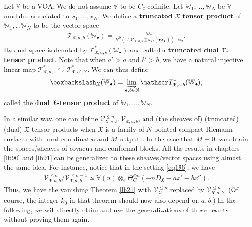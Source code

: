 \documentclass[12pt,b5paper,notitlepage]{report}
\theoremstyle{definition}
\theoremstyle{plain}
\newcommand{\fk}{\mathfrak}
\newcommand{\scr}{\mathscr}
\newcommand{\SX}{S_{\fk X}}
\newcommand{\DX}{D_{\fk X}}
\newcommand{\blt}{\bullet}
\newcommand{\Vbb}{\mathbb V}
\newcommand{\Wbb}{\mathbb W}
\newcommand{\Cbb}{\mathbb C}
\newcommand{\Nbb}{\mathbb N}
\newcommand{\low}{\mathrm{low}}
\numberwithin{equation}{section}
\begin{document}
Let $\Vbb$ be a  VOA. We do not assume $\Vbb$ to be $C_2$-cofinite. Let $\Wbb_1,\dots,\Wbb_N$ be $\Vbb$-modules associated to $x_1,\dots,x_N$. We define a \textbf{truncated  $\fk X$-tensor product} of $\Wbb_1,\dots\Wbb_N$  to be the vector space \index{T@$\scr T_{\fk X,a,b}(\Wbb_\blt),\scr T_{\fk X,a,b}^*(\Wbb_\blt)$}
\begin{align}
\scr T_{\fk X,a,b}(\Wbb_\blt)=\frac{\Wbb_\blt}{H^0(C,\scr V_{\fk X,a,b}\otimes\omega_C(\blt\SX))\cdot\Wbb_\blt}.
\end{align}
Its dual space is denoted by $\scr T_{\fk X,a,b}^*(\Wbb_\blt)$ and called a \textbf{truncated dual $\fk X$-tensor product}. Note that when $a'>a$ and $b'>b$, we have a natural injective linear map $\scr T_{\fk X,a,b}^*\hookrightarrow \scr T_{\fk X,a',b'}^*$. We can thus define \index{W@$\boxbackslash_{\fk X}(\Wbb_\blt),\boxbackslash_{\fk X}^\low(\Wbb_\blt)$}
\begin{gather*}
\boxbackslash_{\fk X}(\Wbb_\blt)=\varinjlim_{a,b\in\Nbb}\scr T_{\fk X,a,b}^*(\Wbb_\blt),
\end{gather*}
called the \textbf{dual $\fk X$-tensor product} of $\Wbb_1,\dots,\Wbb_N$.


In a similar way, one can define $\scr V_{\fk X,a,b}^{\leq n},\scr V_{\fk X,a,b}$, and (the sheaves of) (truncated) (dual) $\fk X$-tensor products  when $\fk X$ is a family of $N$-pointed compact Riemann surfaces with local coordinates and $M$-outputs. In the case that $M=0$, we obtain the spaces/sheaves of covacua and conformal blocks. All the results in chapters \ref{lb90} and \ref{lb91} can be generalized to these sheaves/vector spaces using almost the same idea. For instance, notice that in the setting \eqref{eq196}, we have
\begin{align}
\scr V_{\fk X,a,b}^{\leq n}/\scr V_{\fk X,a,b}^{\leq n-1}\simeq\Vbb(n)\otimes_\Cbb\Theta_C^{\otimes n}(-n\DX-ax'-bx'').
\end{align}
Thus, we have the vanishing Theorem \ref{lb21} with $\scr V_C^{\leq n}$ replaced by $\scr V_{\fk X,a,b}^{\leq n}$. (Of course, the integer $k_0$ in that theorem should now also depend on $a,b$.) In the following, we will directly claim and use the generalizations of those results without  proving them again.
\end{document}
